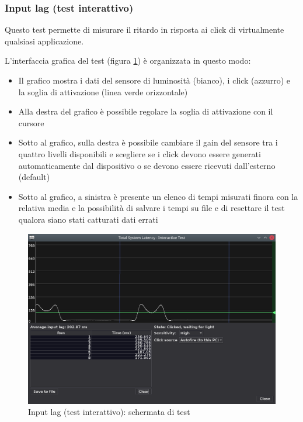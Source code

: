\subsubsection{Input lag (test interattivo)}
Questo test permette di misurare il ritardo in risposta ai click di virtualmente qualsiasi applicazione.

L'interfaccia grafica del test (figura \ref{fig:gui_interactiveinputlag_results}) è organizzata in questo modo:\begin{itemize}
	\item Il grafico mostra i dati del sensore di luminosità (bianco), i click (azzurro) e la soglia di attivazione (linea verde orizzontale)
	\item Alla destra del grafico è possibile regolare la soglia di attivazione con il cursore
	\item Sotto al grafico, sulla destra è possibile cambiare il gain del sensore tra i quattro livelli disponibili e scegliere se i click devono essere generati automaticamente dal dispositivo o se devono essere ricevuti dall'esterno (default)
	\item Sotto al grafico, a sinistra è presente un elenco di tempi misurati finora con la relativa media e la possibilità di salvare i tempi su file e di resettare il test qualora siano stati catturati dati errati
\end{itemize}

\begin{figure}[H]
	\centering
	\includegraphics[width=\textwidth]{Applicazione_files/gui_interactiveinputlag_results.png}
	\caption{Input lag (test interattivo): schermata di test}
	\label{fig:gui_interactiveinputlag_results}
\end{figure}

